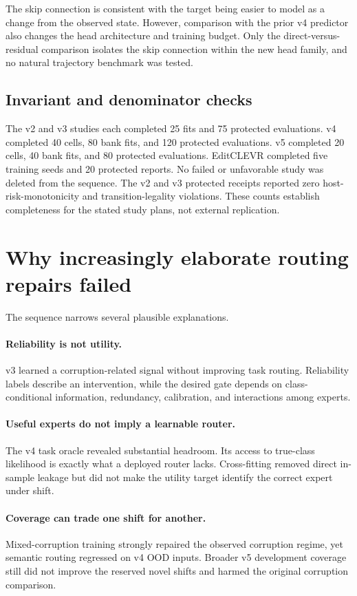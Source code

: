 \documentclass[10pt]{article}
\begin{document}
The skip connection is consistent with the target being easier to model as a change from
the observed state. However, comparison with the prior v4 predictor also changes the head
architecture and training budget. Only the direct-versus-residual comparison isolates the
skip connection within the new head family, and no natural trajectory benchmark was tested.

\subsection{Invariant and denominator checks}
The v2 and v3 studies each completed 25 fits and 75 protected evaluations. v4 completed 40
cells, 80 bank fits, and 120 protected evaluations. v5 completed 20 cells, 40 bank fits,
and 80 protected evaluations. EditCLEVR completed five training seeds and 20 protected
reports. No failed or unfavorable study was deleted from the sequence. The v2 and v3
protected receipts reported zero host-risk-monotonicity and transition-legality violations.
These counts establish completeness for the stated study plans, not external replication.

\section{Why increasingly elaborate routing repairs failed}
The sequence narrows several plausible explanations.

\paragraph{Reliability is not utility.}
v3 learned a corruption-related signal without improving task routing. Reliability labels
describe an intervention, while the desired gate depends on class-conditional information,
redundancy, calibration, and interactions among experts.

\paragraph{Useful experts do not imply a learnable router.}
The v4 task oracle revealed substantial headroom. Its access to true-class likelihood is
exactly what a deployed router lacks. Cross-fitting removed direct in-sample leakage but did
not make the utility target identify the correct expert under shift.

\paragraph{Coverage can trade one shift for another.}
Mixed-corruption training strongly repaired the observed corruption regime, yet semantic
routing regressed on v4 OOD inputs. Broader v5 development coverage still did not improve
the reserved novel shifts and harmed the original corruption comparison.
\end{document}
